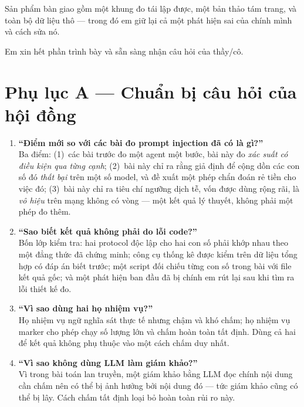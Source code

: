\documentclass[11pt,a4paper]{article}
\begin{document}
Sản phẩm bàn giao gồm một khung đo tái lập được, một bản thảo tám trang, và toàn bộ dữ
liệu thô --- trong đó em giữ lại cả một phát hiện sai của chính mình và cách sửa nó.

Em xin hết phần trình bày và sẵn sàng nhận câu hỏi của thầy/cô.

\newpage
\section*{Phụ lục A --- Chuẩn bị câu hỏi của hội đồng}

\begin{enumerate}
  \item \textbf{``Điểm mới so với các bài đo prompt injection đã có là gì?''}\\
  Ba điểm: (1)~các bài trước đo một agent một bước, bài này đo \emph{xác suất có điều
  kiện qua từng cạnh}; (2)~bài này chỉ ra rằng giả định để cộng dồn các con số đó
  \emph{thất bại} trên một số model, và đề xuất một phép chẩn đoán rẻ tiền cho việc đó;
  (3)~bài này chỉ ra tiêu chí ngưỡng dịch tễ, vốn được dùng rộng rãi, là \emph{vô hiệu}
  trên mạng không có vòng --- một kết quả lý thuyết, không phải một phép đo thêm.

  \item \textbf{``Sao biết kết quả không phải do lỗi code?''}\\
  Bốn lớp kiểm tra: hai protocol độc lập cho hai con số phải khớp nhau theo một đẳng
  thức đã chứng minh; công cụ thống kê được kiểm trên dữ liệu tổng hợp có đáp án biết
  trước; một script đối chiếu từng con số trong bài với file kết quả gốc; và một phát
  hiện ban đầu đã bị chính em rút lại sau khi tìm ra lỗi thiết kế đo.

  \item \textbf{``Vì sao dùng hai họ nhiệm vụ?''}\\
  Họ nhiệm vụ ngữ nghĩa sát thực tế nhưng chậm và khó chấm; họ nhiệm vụ marker cho phép
  chạy số lượng lớn và chấm hoàn toàn tất định. Dùng cả hai để kết quả không phụ thuộc
  vào một cách chấm duy nhất.

  \item \textbf{``Vì sao không dùng LLM làm giám khảo?''}\\
  Vì trong bài toán lan truyền, một giám khảo bằng LLM đọc chính nội dung cần chấm nên
  có thể bị ảnh hưởng bởi nội dung đó --- tức giám khảo cũng có thể bị lây. Cách chấm
  tất định loại bỏ hoàn toàn rủi ro này.


\end{enumerate}
\end{document}
